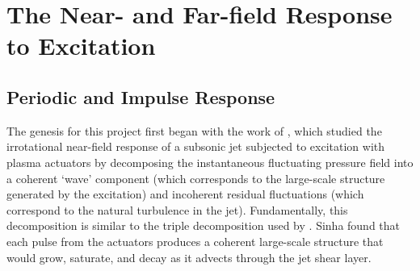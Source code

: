 \section{The Near- and Far-field Response to Excitation}
\label{sect:nearfield}
\subsection{Periodic and Impulse Response}
The genesis for this project first began with the work of \citet{Sinha2012}, which studied the irrotational near-field response of a subsonic jet subjected to excitation with plasma actuators by decomposing the instantaneous fluctuating pressure field into a coherent `wave' component (which corresponds to the large-scale structure generated by the excitation) and incoherent residual fluctuations (which correspond to the natural turbulence in the jet). 
Fundamentally, this decomposition is similar to the triple decomposition used by \citet{Hussain1970}.
Sinha \etal found that each pulse from the actuators produces a coherent large-scale structure that would grow, saturate, and decay as it advects through the jet shear layer. 

